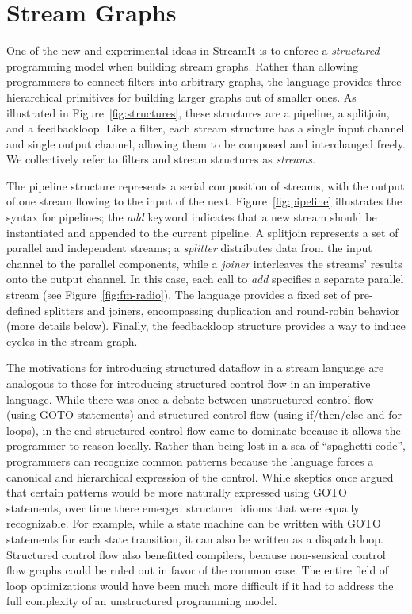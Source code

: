 \section{Stream Graphs}

One of the new and experimental ideas in StreamIt is to enforce a {\it
  structured} programming model when building stream graphs.  Rather
than allowing programmers to connect filters into arbitrary graphs,
the language provides three hierarchical primitives for building
larger graphs out of smaller ones.  As illustrated in
Figure~\ref{fig:structures}, these structures are a pipeline, a
splitjoin, and a feedbackloop.  Like a filter, each stream structure
has a single input channel and single output channel, allowing them to
be composed and interchanged freely.  We collectively refer to filters
and stream structures as {\it streams}.

The pipeline structure represents a serial composition of streams,
with the output of one stream flowing to the input of the next.
Figure~\ref{fig:pipeline} illustrates the syntax for pipelines; the
{\it add} keyword indicates that a new stream should be instantiated
and appended to the current pipeline.  A splitjoin represents a set of
parallel and independent streams; a {\it splitter} distributes data
from the input channel to the parallel components, while a {\it
  joiner} interleaves the streams' results onto the output channel.
In this case, each call to {\it add} specifies a separate parallel
stream (see Figure~\ref{fig:fm-radio}).  The language provides a fixed
set of pre-defined splitters and joiners, encompassing duplication and
round-robin behavior (more details below).  Finally, the feedbackloop
structure provides a way to induce cycles in the stream graph.


The motivations for introducing structured dataflow in a stream
language are analogous to those for introducing structured control
flow in an imperative language.  While there was once a debate between
unstructured control flow (using GOTO statements) and structured
control flow (using if/then/else and for loops), in the end structured
control flow came to dominate because it allows the programmer to
reason locally.  Rather than being lost in a sea of ``spaghetti
code'', programmers can recognize common patterns because the language
forces a canonical and hierarchical expression of the control.  While
skeptics once argued that certain patterns would be more naturally
expressed using GOTO statements, over time there emerged structured
idioms that were equally recognizable.  For example, while a state
machine can be written with GOTO statements for each state transition,
it can also be written as a dispatch loop.  Structured control flow
also benefitted compilers, because non-sensical control flow graphs
could be ruled out in favor of the common case.  The entire field of
loop optimizations would have been much more difficult if it had to
address the full complexity of an unstructured programming model.

